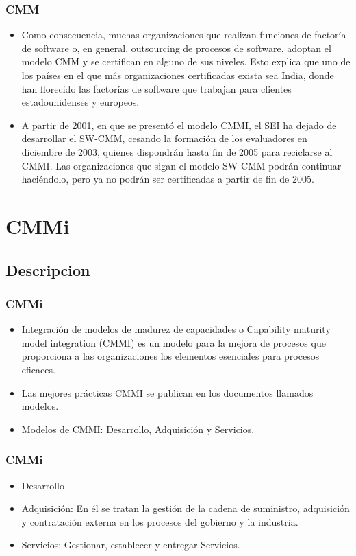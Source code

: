 \documentclass{beamer}
\begin{document}
\frame
{
  \frametitle{CMM}
  \begin{itemize}
    \item<1-> Como consecuencia, muchas organizaciones que realizan funciones de factoría de software o, en general, outsourcing de procesos de software, adoptan el modelo CMM y se certifican en alguno de sus niveles. Esto explica que uno de los países en el que más organizaciones certificadas exista sea India, donde han florecido las factorías de software que trabajan para clientes estadounidenses y europeos.

    \item<2-> A partir de 2001, en que se presentó el modelo CMMI, el SEI ha dejado de desarrollar el SW-CMM, cesando la formación de los evaluadores en diciembre de 2003, quienes dispondrán hasta fin de 2005 para reciclarse al CMMI. Las organizaciones que sigan el modelo SW-CMM podrán continuar haciéndolo, pero ya no podrán ser certificadas a partir de fin de 2005.
  \end{itemize}
}

\section{CMMi}
\subsection{Descripcion}
\frame
{
  \frametitle{CMMi}
  	\begin{itemize}
  	\item<1-> Integración de modelos de madurez de capacidades o Capability maturity model integration (CMMI) es un modelo para la mejora de procesos que proporciona a las organizaciones los elementos esenciales para procesos eficaces.
  	\item<2-> Las mejores prácticas CMMI se publican en los documentos llamados {\Large modelos}.
  	\item<3-> Modelos de CMMI: Desarrollo, Adquisición y Servicios.
  	\end{itemize}
}

\frame
{
  \frametitle{CMMi}
  	\begin{itemize}
  	\item<1-> Desarrollo
  	\item<2-> Adquisición: En él se tratan la gestión de la cadena de suministro, adquisición y contratación externa en los procesos del gobierno y la industria.
  	\item<3-> Servicios: Gestionar, establecer y entregar Servicios.
  	\end{itemize}
}
\end{document}
